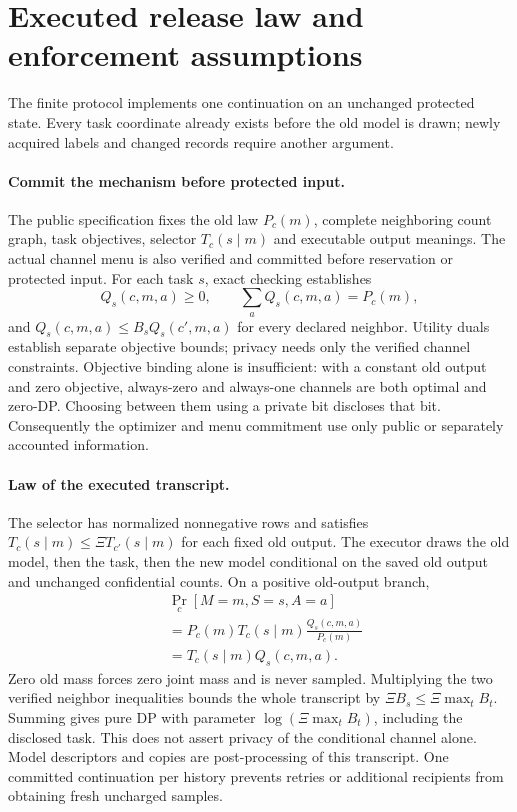 \section{Executed release law and enforcement assumptions}
\label{app:finite-enforcement}
The finite protocol implements one continuation on an unchanged protected
state. Every task coordinate already exists before the old model is drawn;
newly acquired labels and changed records require another argument.

\paragraph{Commit the mechanism before protected input.}
The public specification fixes the old law $P_c(m)$, complete neighboring
count graph, task objectives, selector $T_c(s\mid m)$ and executable output
meanings. The actual channel menu is also verified and committed before
reservation or protected input. For each task $s$, exact checking establishes
\[
 Q_s(c,m,a)\ge0,\qquad \sum_a Q_s(c,m,a)=P_c(m),
\]
and $Q_s(c,m,a)\le B_s Q_s(c',m,a)$ for every declared neighbor.
Utility duals establish separate objective bounds; privacy needs only the
verified channel constraints. Objective binding alone is insufficient:
with a constant old output and zero objective, always-zero and always-one
channels are both optimal and zero-DP. Choosing between them using a private
bit discloses that bit. Consequently the optimizer and menu commitment use
only public or separately accounted information.

\paragraph{Law of the executed transcript.}
The selector has normalized nonnegative rows and satisfies
$T_c(s\mid m)\le\Xi T_{c'}(s\mid m)$ for each fixed old output.
The executor draws the old model, then the task, then the new model
conditional on the saved old output and unchanged confidential counts.
On a positive old-output branch,
\[
 \begin{aligned}
 &\Pr_c[M=m,S=s,A=a]\\
 &=P_c(m)T_c(s\mid m)\frac{Q_s(c,m,a)}{P_c(m)}\\
 &=T_c(s\mid m)Q_s(c,m,a).
 \end{aligned}
\]
Zero old mass forces zero joint mass and is never sampled. Multiplying
the two verified neighbor inequalities bounds the whole transcript by
$\Xi B_s\le\Xi\max_t B_t$. Summing gives pure DP with parameter
$\log(\Xi\max_t B_t)$, including the disclosed task. This does not
assert privacy of the conditional channel alone. Model descriptors and
copies are post-processing of this transcript. One committed continuation
per history prevents retries or additional recipients from obtaining
fresh uncharged samples.


